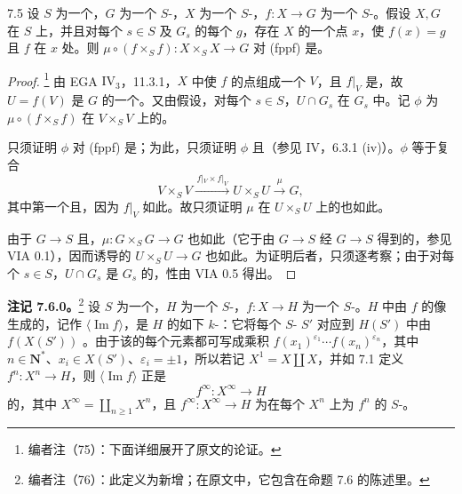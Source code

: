 \begin{SGAresult}{}{7.5}
设 $S$ 为一个，$G$ 为一个 $S$-，$X$ 为一个 $S$-，$f:X\to G$ 为一个 $S$-。假设 $X,G$ 在 $S$ 上，并且对每个 $s\in S$ 及 $G_s$ 的每个 $g$，存在 $X$ 的一个点 $x$，使 $f(x)=g$ 且 $f$ 在 $x$ 处。则 $\mu\circ(f\times_S f):X\times_S X\to G$ 对 (fppf) 是。
\end{SGAresult}
\begin{proof}
\footnote{编者注（75）：下面详细展开了原文的论证。}
由 EGA $\mathrm{IV}_3$，11.3.1，$X$ 中使 $f$ 的点组成一个 $V$，且 $f|_V$ 是，故 $U=f(V)$ 是 $G$ 的一个。又由假设，对每个 $s\in S$，$U\cap G_s$ 在 $G_s$ 中。记 $\phi$ 为 $\mu\circ(f\times_S f)$ 在 $V\times_S V$ 上的。

只须证明 $\phi$ 对 (fppf) 是；为此，只须证明 $\phi$ 且（参见 IV，6.3.1 (iv)）。$\phi$ 等于复合
\[
V\times_S V\xrightarrow{\,f|_V\times f|_V\,}U\times_S U\xrightarrow{\,\mu\,}G,
\]
其中第一个且，因为 $f|_V$ 如此。故只须证明 $\mu$ 在 $U\times_S U$ 上的也如此。

由于 $G\to S$ 且，$\mu:G\times_S G\to G$ 也如此（它于由 $G\to S$ 经 $G\to S$ 得到的，参见 VIA 0.1），因而诱导的 $U\times_S U\to G$ 也如此。为证明后者，只须逐考察；由于对每个 $s\in S$，$U\cap G_s$ 是 $G_s$ 的，性由 VIA 0.5 得出。
\end{proof}

\textbf{注记 7.6.0。}\footnote{编者注（76）：此定义为新增；在原文中，它包含在命题 7.6 的陈述里。}
设 $S$ 为一个，$H$ 为一个 $S$-，$f:X\to H$ 为一个 $S$-。$H$ 中由 $f$ 的像生成的，记作 $\langle\operatorname{Im}f\rangle$，是 $H$ 的如下 $k$-：它将每个 $S$- $S'$ 对应到 $H(S')$ 中由 $f(X(S'))$ 。由于该的每个元素都可写成乘积 $f(x_1)^{\varepsilon_1}\cdots f(x_n)^{\varepsilon_n}$，其中 $n\in\mathbf N^*$、$x_i\in X(S')$、$\varepsilon_i=\pm1$，所以若记 $X^1=X\coprod X$，并如 7.1 定义 $f^n:X^n\to H$，则 $\langle\operatorname{Im}f\rangle$ 正是
\[
f^\infty:X^\infty\longrightarrow H
\]
的，其中 $X^\infty=\coprod_{n\geq1}X^n$，且 $f^\infty:X^\infty\to H$ 为在每个 $X^n$ 上为 $f^n$ 的 $S$-。

